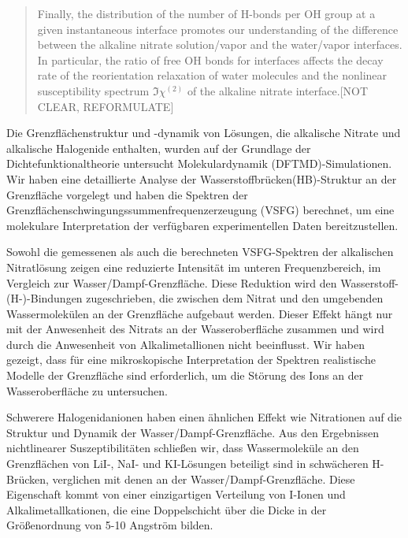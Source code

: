 \documentclass[
11pt, %
ngerman,
english, %
singlespacing, %
headsepline, %
]{MastersDoctoralThesis} %
\begin{document}
\begin{abstract}
Finally, the distribution of the number of H-bonds per OH group at a given instantaneous interface promotes our understanding of the difference between the alkaline nitrate
solution/vapor and the water/vapor interfaces. In particular, the ratio of free OH bonds for interfaces affects the decay rate of the reorientation relaxation of water
	molecules and the nonlinear susceptibility spectrum $\Im \chi^{(2)}$ of the alkaline nitrate interface.[NOT CLEAR, REFORMULATE]
\end{abstract}

{
\begin{extraAbstract}
\addchaptertocentry{\abstractname} %
Die Grenzflächenstruktur und -dynamik von Lösungen, die alkalische Nitrate und alkalische Halogenide enthalten, wurden auf der Grundlage der Dichtefunktionaltheorie untersucht
Molekulardynamik (DFTMD)-Simulationen. Wir haben eine detaillierte Analyse der Wasserstoffbrücken(HB)-Struktur an der Grenzfläche vorgelegt und
haben die Spektren der Grenzflächenschwingungssummenfrequenzerzeugung (VSFG) berechnet, um eine molekulare Interpretation der verfügbaren experimentellen Daten bereitzustellen.

Sowohl die gemessenen als auch die berechneten VSFG-Spektren der alkalischen Nitratlösung zeigen eine reduzierte Intensität im unteren Frequenzbereich,
im Vergleich zur Wasser/Dampf-Grenzfläche.
Diese Reduktion wird den Wasserstoff-(H-)-Bindungen zugeschrieben, die zwischen dem Nitrat und den umgebenden Wassermolekülen an der Grenzfläche aufgebaut werden.
Dieser Effekt hängt nur mit der Anwesenheit des Nitrats an der Wasseroberfläche zusammen und wird durch die Anwesenheit von Alkalimetallionen nicht beeinflusst.
Wir haben gezeigt, dass für eine mikroskopische Interpretation der Spektren
realistische Modelle der Grenzfläche sind erforderlich, um die Störung des Ions an der Wasseroberfläche zu untersuchen.

Schwerere Halogenidanionen haben einen ähnlichen Effekt wie Nitrationen auf die Struktur und Dynamik der Wasser/Dampf-Grenzfläche.
Aus den Ergebnissen nichtlinearer Suszeptibilitäten schließen wir, dass Wassermoleküle an den Grenzflächen von LiI-, NaI- und KI-Lösungen beteiligt sind
in schwächeren H-Brücken, verglichen mit denen an der Wasser/Dampf-Grenzfläche.
Diese Eigenschaft kommt von einer einzigartigen Verteilung von I-Ionen und Alkalimetallkationen,
die eine Doppelschicht über die Dicke in der Größenordnung von 5-10 Angström bilden.


\end{extraAbstract}}
\end{document}
